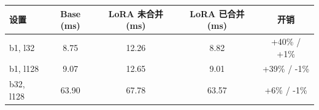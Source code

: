 \begin{tabular}{l c c c c}
\toprule
设置 & Base (ms) & LoRA 未合并 (ms) & LoRA 已合并 (ms) & 开销 \\
\midrule
b1, l32 & 8.75 & 12.26 & 8.82 & +40\% / +1\% \\
b1, l128 & 9.07 & 12.65 & 9.01 & +39\% / -1\% \\
b32, l128 & 63.90 & 67.78 & 63.57 & +6\% / -1\% \\
\bottomrule
\end{tabular}
